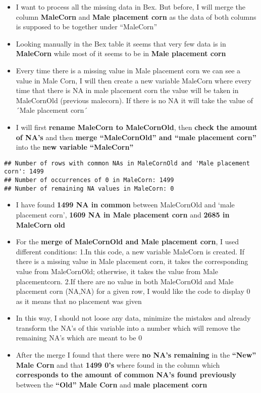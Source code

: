 \documentclass[
]{article}
\providecommand{\tightlist}{%
  \setlength{\itemsep}{0pt}\setlength{\parskip}{0pt}}
\begin{document}
\begin{itemize}
\tightlist
\item
  I want to process all the missing data in Bex. But before, I will
  merge the column \textbf{MaleCorn} and \textbf{Male placement corn} as
  the data of both columns is supposed to be together under ``MaleCorn''
\item
  Looking manually in the Bex table it seems that very few data is in
  \textbf{MaleCorn} while most of it seems to be in \textbf{Male
  placement corn}
\item
  Every time there is a missing value in Male placement corn we can see
  a value in Male Corn, I will then create a new variable MaleCorn where
  every time that there is NA in male placement corn the value will be
  taken in MaleCornOld (previous malecorn). If there is no NA it will
  take the value of ´Male placement corn´
\item
  I will first \textbf{rename MaleCorn to MaleCornOld}, then
  \textbf{check the amount of NA's} and then \textbf{merge
  ``MaleCornOld'' and ``male placement corn''} into the \textbf{new
  variable ``MaleCorn''}
\end{itemize}

\begin{verbatim}
## Number of rows with common NAs in MaleCornOld and 'Male placement corn': 1499 
## Number of occurrences of 0 in MaleCorn: 1499 
## Number of remaining NA values in MaleCorn: 0
\end{verbatim}

\begin{itemize}
\item
  I have found \textbf{1499 NA in common} between MaleCornOld and `male
  placement corn', \textbf{1609 NA in Male placement corn} and
  \textbf{2685 in MaleCorn old}
\item
  For the \textbf{merge of MaleCornOld and Male placement corn}, I used
  different conditions: 1.In this code, a new variable MaleCorn is
  created. If there is a missing value in Male placement corn, it takes
  the corresponding value from MaleCornOld; otherwise, it takes the
  value from Male placementcorn. 2.If there are no value in both
  MaleCornOld and Male placement corn (NA,NA) for a given row, I would
  like the code to display 0 as it means that no placement was given
\item
  In this way, I should not loose any data, minimize the mistakes and
  already transform the NA's of this variable into a number which will
  remove the remaining NA's which are meant to be 0
\item
  After the merge I found that there were \textbf{no NA's remaining} in
  the \textbf{``New'' Male Corn} and that \textbf{1499 0's} where found
  in the column which \textbf{corresponds to the amount of common NA's
  found previously} between the \textbf{``Old'' Male Corn} and
  \textbf{male placement corn}
\end{itemize}
\end{document}
